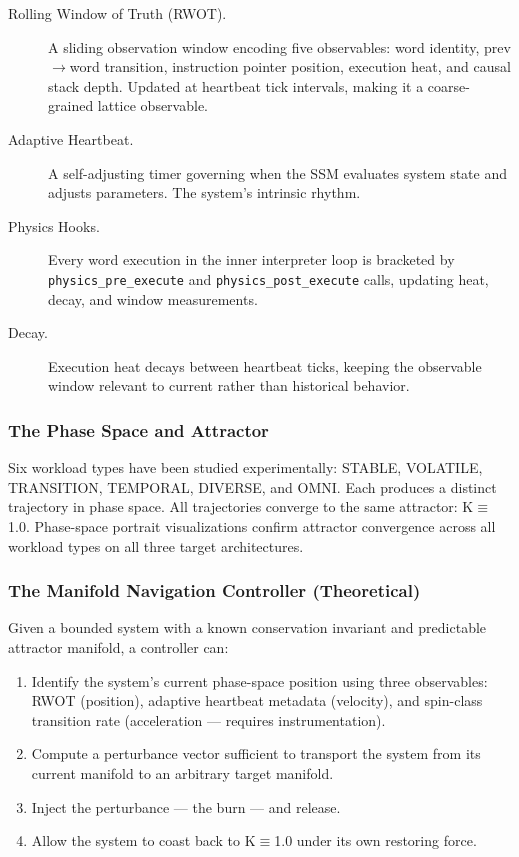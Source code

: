 \begin{description}
  \item[Rolling Window of Truth (RWOT).] A sliding observation window
        encoding five observables: word identity, prev$\to$word transition,
        instruction pointer position, execution heat, and causal stack depth.
        Updated at heartbeat tick intervals, making it a coarse-grained
        lattice observable.
  \item[Adaptive Heartbeat.] A self-adjusting timer governing when the SSM
        evaluates system state and adjusts parameters. The system's intrinsic
        rhythm.
  \item[Physics Hooks.] Every word execution in the inner interpreter loop
        is bracketed by \texttt{physics\_pre\_execute} and
        \texttt{physics\_post\_execute} calls, updating heat, decay, and
        window measurements.
  \item[Decay.] Execution heat decays between heartbeat ticks, keeping the
        observable window relevant to current rather than historical behavior.
\end{description}

\subsubsection{The Phase Space and Attractor}

Six workload types have been studied experimentally: STABLE, VOLATILE,
TRANSITION, TEMPORAL, DIVERSE, and OMNI. Each produces a distinct trajectory
in phase space. All trajectories converge to the same attractor: K$\equiv$1.0.
Phase-space portrait visualizations confirm attractor convergence across all
workload types on all three target architectures.

\subsubsection{The Manifold Navigation Controller (Theoretical)}

Given a bounded system with a known conservation invariant and predictable
attractor manifold, a controller can:

\begin{enumerate}
  \item Identify the system's current phase-space position using three
        observables: RWOT (position), adaptive heartbeat metadata (velocity),
        and spin-class transition rate (acceleration — requires instrumentation).
  \item Compute a perturbance vector sufficient to transport the system from
        its current manifold to an arbitrary target manifold.
  \item Inject the perturbance — the burn — and release.
  \item Allow the system to coast back to K$\equiv$1.0 under its own restoring
        force.
\end{enumerate}

